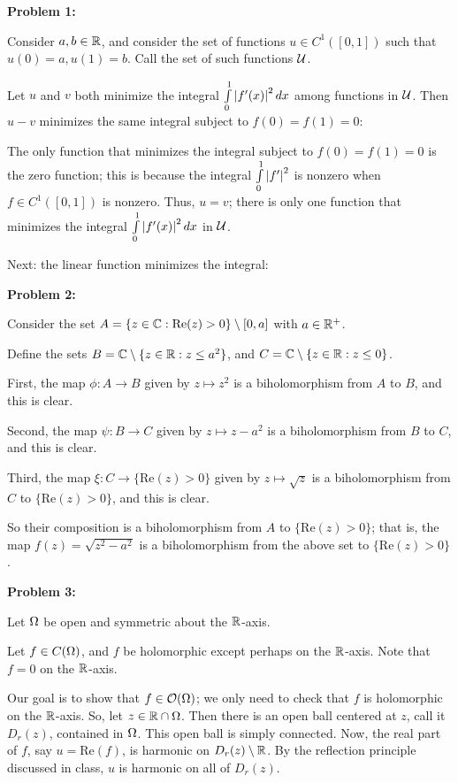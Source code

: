 \documentclass[a4paper,12pt]{article}
\begin{document}
{\bf Problem 1:}

Consider $a, b \in \mathbb{R}$, and consider the set of functions $u \in C^1([0,1])$ such that $u(0)=a, u(1)=b$. Call the set of such functions $\mathcal{U}$.

Let $u$ and $v$ both minimize the integral $\int\limits_0^1 \left\lvert f'(x) \right\rvert^2 dx$ among functions in $\mathcal{U}$. Then $u-v$ minimizes the same integral subject to $f(0)=f(1)=0$:


The only function that minimizes the integral subject to $f(0)=f(1)=0$ is the zero function; this is because the integral $\int\limits_0^1 \left\lvert f' \right\rvert^2$ is nonzero when $f \in C^1([0,1])$ is nonzero. Thus, $u=v$; there is only one function that minimizes the integral $\int\limits_0^1 \left\lvert f'(x) \right\rvert^2 dx$ in $\mathcal{U}$.

Next: the linear function minimizes the integral: %

\shunt

{\bf Problem 2:}

Consider the set $A=\{z \in \mathbb{C}: \text{Re}(z) >0\} \setminus [0,a]$ with $a \in \mathbb{R}^+$.

Define the sets $B = \mathbb{C} \setminus \{z \in \mathbb{R}: z \leq a^2\}$, and $C = \mathbb{C} \setminus \{z \in \mathbb{R}: z \leq 0\}$.

First, the map $\phi: A \to B$ given by $z \mapsto z^2$ is a biholomorphism from $A$ to $B$, and this is clear.

Second, the map $\psi: B \to C$ given by $z \mapsto z-a^2$ is a biholomorphism from $B$ to $C$, and this is clear.

Third, the map $\xi: C \to \{\text{Re}(z) >0\}$ given by $z \mapsto \sqrt{z}$ is a biholomorphism from $C$ to $\{\text{Re}(z) >0\}$, and this is clear.

So their composition is a biholomorphism from $A$ to $\{\text{Re}(z) >0\}$; that is, the map $f(z) = \sqrt{z^2-a^2}$ is a biholomorphism from the above set to $\{\text{Re}(z) >0\}$.

\shunt

{\bf Problem 3:}

Let $\Omega$ be open and symmetric about the $\mathbb{R}$-axis.

Let $f \in C(\Omega)$, and $f$ be holomorphic except perhaps on the $\mathbb{R}$-axis. Note that $f=0$ on the $\mathbb{R}$-axis.

Our goal is to show that $f \in \mathcal{O}(\Omega)$; we only need to check that $f$ is holomorphic on the $\mathbb{R}$-axis. So, let $z \in \mathbb{R} \cap \Omega$. Then there is an open ball centered at $z$, call it $D_r(z)$, contained in $\Omega$. This open ball is simply connected. Now, the real part of $f$, say $u = \text{Re}(f)$, is harmonic on $D_r(z) \setminus \mathbb{R}$. By the reflection principle discussed in class, $u$ is harmonic on all of $D_r(z)$.
\end{document}

